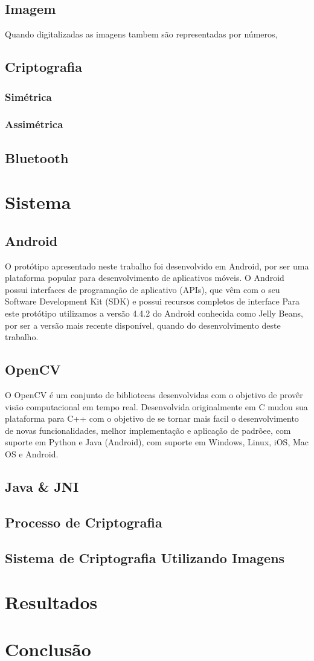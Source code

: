 \documentclass[12pt]{article}
\begin{document}
\subsection{Imagem}
Quando digitalizadas as imagens tambem são representadas por números,  
\subsection{Criptografia}
\subsubsection{Simétrica}
\subsubsection{Assimétrica}
\subsection{Bluetooth}

\section{Sistema}
\subsection{Android}
O protótipo apresentado neste trabalho foi desenvolvido em Android, por ser uma plataforma popular para desenvolvimento de aplicativos móveis. O Android possui interfaces de programação de aplicativo (APIs), que vêm com o seu Software Development Kit (SDK) e possui recursos completos de interface\cite{android:2014:Online}
Para este protótipo utilizamos a versão 4.4.2 do Android conhecida como Jelly Beans, por ser a versão mais recente disponível, quando do desenvolvimento deste trabalho. 

\subsection{OpenCV}
O OpenCV é um conjunto de bibliotecas desenvolvidas com o objetivo de provêr visão computacional em tempo real. Desenvolvida originalmente em C mudou sua plataforma para C++ com o objetivo de se tornar mais facil o desenvolvimento de novas funcionalidades, melhor implementação e aplicação de padrõee, com suporte em Python e Java (Android), com suporte em Windows, Linux, iOS, Mac OS e Android.
\subsection{Java \& JNI}
\subsection{Processo de Criptografia}
\subsection{Sistema de Criptografia Utilizando Imagens}

\section{Resultados}
\section{Conclusão}




\end{document}
